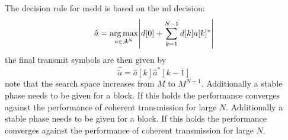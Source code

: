 The decision rule for \ac{msdd} is based on the \ac{ml} decision:
\begin{equation}
    \hat{a} = \operatorname*{arg\,max}_{a \in \mathcal{A}^N} \abs{d[0] + \sum_{k=1}^{N-1} d[k] a[k]^*}
\end{equation}
the final transmit symbols are then given by
\begin{equation}
    \hat{\tilde{a}} = \hat{a}[k]\hat{a}^*[k-1]
\end{equation}
note that the search space increases from $M$ to $M^{N-1}$. Additionally 
a stable phase needs to be given for a block. If this holds the performance
converges against the performance of coherent transmission for large $N$. Additionally 
a stable phase needs to be given for a block. If this holds the performance
converges against the performance of coherent transmission for large $N$.
